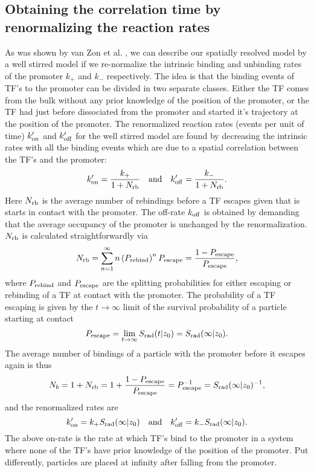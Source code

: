 \subsection{Obtaining the correlation time by renormalizing the reaction rates}
As was shown by van Zon et al. \cite{VanZon2006}, we can describe our spatially resolved model by a well stirred model if we re-normalize the intrinsic binding and unbinding rates of the promoter $k_+$ and $k_-$ respectively. The idea is that the binding events of TF's to the promoter can be divided in two separate classes. Either the TF comes from the bulk without any prior knowledge of the position of the promoter, or the TF had just before dissociated from the promoter and started it's trajectory at the position of the promoter. The renormalized reaction rates (events per unit of time) $k'_{\rm on}$ and $k'_{\rm off}$ for the well stirred model are found by decreasing the intrinsic rates with all the binding events which are due to a spatial correlation between the TF's and the promoter:
\begin{equation}
 k'_{\rm on} = \frac{k_+}{1 + N_{\rm rb}} \quad \text{and} \quad k'_{\rm off} = \frac{k_-}{1 + N_{\rm rb}}.
\end{equation}
Here $N_{\rm rb}$ is the average number of rebindings before a TF escapes given that is starts in contact with the promoter. The off-rate $k_{\rm off}$ is obtained by demanding that the average occupancy of the promoter is unchanged by the renormalization. $N_{\rm rb}$ is calculated straightforwardly via
\begin{equation}
 N_{\rm rb} = \sum_{n=1}^{\infty} n \left( P_{\rm rebind} \right)^n P_{\rm escape} = \frac{1-P_{\rm escape}}{P_{\rm escape}},
\end{equation}
where $P_{\rm rebind}$ and $P_{\rm escape}$ are the splitting probabilities for either escaping or rebinding of a TF at contact with the promoter. The probability of a TF escaping is given by the $t \to \infty$ limit of the survival probability of a particle starting at contact 
\begin{equation}
 P_{\rm escape} = \lim_{t \to \infty} S_{\rm rad}(t|z_0) = S_{\rm rad}(\infty|z_0).
\end{equation}
The average number of bindings of a particle with the promoter before it escapes again is thus
\begin{equation}
 N_b = 1 + N_{\rm rb} = 1 + \frac{1 - P_{\rm escape}}{P_{\rm escape}} = P_{\rm escape}^{-1} = S_{\rm rad}(\infty|z_0)^{-1},
\end{equation}
and the renormalized rates are
\begin{equation}
 k'_{\rm on} = k_+ S_{\rm rad}(\infty|z_0) \quad \text{and} \quad  k'_{\rm off} = k_- S_{\rm rad}(\infty|z_0).
 \elabel{RenRates}
\end{equation}
The above on-rate is the rate at which TF's bind to the promoter in a system where none of the TF's have prior knowledge of the position of the promoter. Put differently, particles are placed at infinity after falling from the promoter. 

